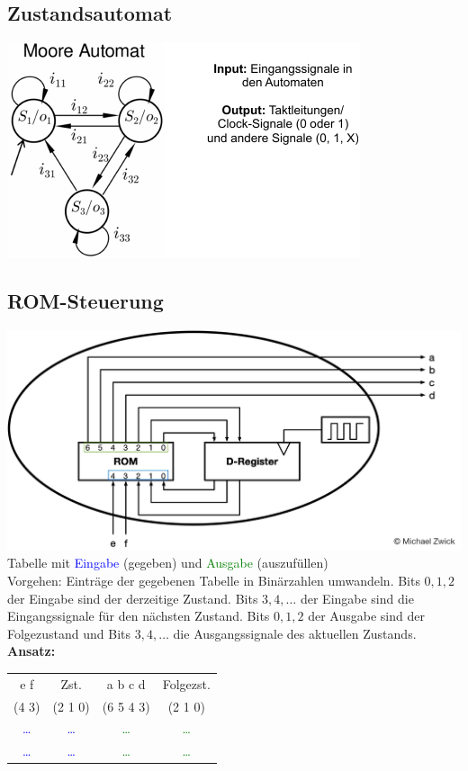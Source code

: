 \documentclass[german, threecolumn, 8pt]{latex4ei/latex4ei_sheet}
\begin{document}
\subsection{Zustandsautomat}
\begin{center}
\includegraphics[width=.75\linewidth]{img/moore-automat.pdf}
\end{center}
\begin{sectionbox}
\subsection{ROM-Steuerung}
\includegraphics[width=.85\linewidth]{img/ROM-Steuerung.jpg} \\
Tabelle mit \textcolor{blue}{Eingabe} (gegeben) und \textcolor{green}{Ausgabe} (auszufüllen) \\
Vorgehen: Einträge der gegebenen Tabelle in Binärzahlen umwandeln. Bits $0, 1, 2$ der Eingabe sind der derzeitige Zustand. Bits $3, 4, \dots$ der Eingabe sind die Eingangssignale für den nächsten Zustand. Bits $0, 1, 2$ der Ausgabe sind der Folgezustand und Bits $3, 4, \dots$ die Ausgangssignale des aktuellen Zustands.\\
\textbf{Ansatz:} \\
\begin{tabular}{c c|c c}
e f & Zst. & a b c d & Folgezst.\\
(4 3) & (2 1 0) & (6 5 4 3) & (2 1 0) \\ \hline
\textcolor{blue}{\dots} &  \textcolor{blue}{\dots} & \textcolor{green}{\dots} & \textcolor{green}{\dots} \\
 \textcolor{blue}{\dots} &  \textcolor{blue}{\dots} & \textcolor{green}{\dots} & \textcolor{green}{\dots} \\
\end{tabular}
\end{sectionbox}
\end{document}
